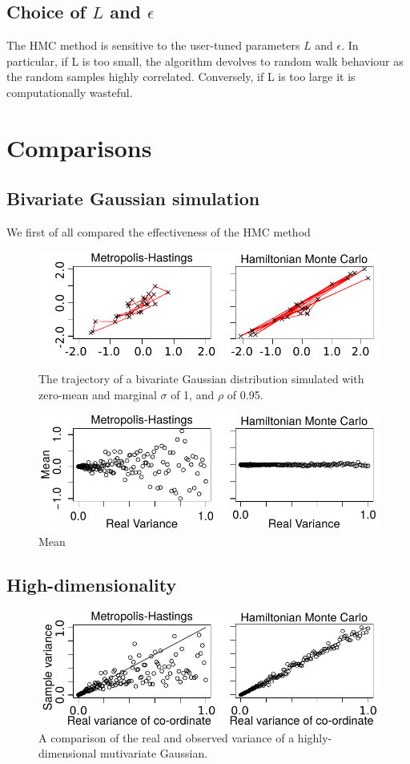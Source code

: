 \documentclass[11pt]{article}
\begin{document}
\subsection{Choice of $L$ and $\epsilon$}
The HMC method is sensitive to the user-tuned parameters $L$ and $\epsilon$. In particular, if L is too small, the algorithm devolves to random walk behaviour as the random samples highly correlated. Conversely, if L is too large it is computationally wasteful.
\section{Comparisons}
\subsection{Bivariate Gaussian simulation}
We first of all compared the effectiveness of the HMC method
\begin{figure}[H]
\center
  \includegraphics[width=5in]{images/MHvsHM_explore.pdf}
\caption{The trajectory of a bivariate Gaussian distribution simulated with zero-mean and marginal $\sigma$ of 1, and $\rho$ of 0.95.}
\end{figure}


\begin{figure}[H]
\center
  \includegraphics[width=5in]{images/MHvsHM_var.pdf}
  \caption{Mean}
\end{figure}
\subsection{High-dimensionality}
\begin{figure}[H]
\center
  \includegraphics[width=5in]{images/MHvsHM_varcoord.pdf}
  \caption{A comparison of the real and observed variance of a highly-dimensional mutivariate Gaussian.}
\end{figure}
\end{document}
